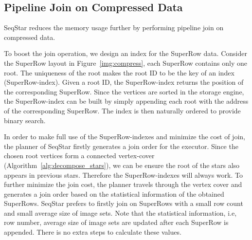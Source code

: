 \subsection{Pipeline Join on Compressed Data}\label{sec:match_join}
SeqStar reduces the memory usage further by performing pipeline join on compressed data.

To boost the join operation, we design an index for the SuperRow data.
Consider the SuperRow layout in Figure~\ref{img:compress}, each SuperRow contains only one root.
The uniqueness of the root makes the root ID to be the key of an index (SuperRow-index).
Given a root ID, the SuperRow-index returns the position of the corresponding SuperRow.
Since the vertices are sorted in the storage engine, the SuperRow-index can be built by simply appending each root with the address of the corresponding SuperRow. The index is then naturally ordered to provide binary search.

In order to make full use of the SuperRow-indexes and minimize the cost of join,
the planner of SeqStar firstly generates a join order for the executor.
Since the chosen root vertices form a connected vertex-cover (Algorithm~\ref{alg:decompose_stars}),
we can be ensure the root of the stars also appears in previous stars.
Therefore the SuperRow-indexes will always work.
To further minimize the join cost, the planner travels through the vertex cover and generates a join order based on the statistical information of the obtained SuperRows.
SeqStar prefers to firstly join on SuperRows with a small row count and small average size of image sets.
Note that the statistical information, i.e, row number, average size of image sets are updated after each SuperRow is appended.
There is no extra steps to calculate these values.

